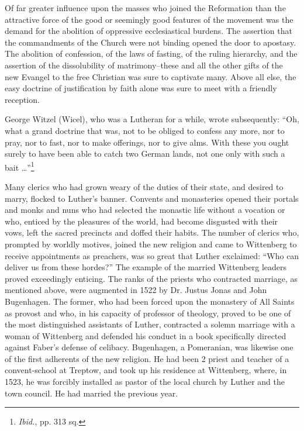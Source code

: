 Of far greater influence upon the masses who joined the Reformation
than the attractive force of the good or seemingly good
features of the movement was the demand for the abolition of oppressive
ecclesiastical burdens. The assertion that the commandments
of the Church were not binding opened the door to apostasy. The
abolition of confession, of the laws of fasting, of the ruling hierarchy,
and the assertion of the dissolubility of matrimony--these and all the
other gifts of the new Evangel to the free Christian was sure to captivate
many. Above all else, the easy doctrine of justification by faith
alone was sure  to meet with a friendly reception.

George Witzel (Wicel), who was a Lutheran for a while, wrote
subsequently: “Oh, what a grand doctrine that was, not to be obliged
to confess any more, nor to pray, nor to fast, nor to make offerings,
nor to give alms. With these you ought surely to have been able to
catch two German lands, not one only with such a bait \dots”\footnote
{\textit{Ibid.}, pp. 313 sq.}

Many clerics who had grown weary of the duties of their state, and
desired to marry, flocked to Luther’s banner. Convents and monasteries
opened their portals and monks and nuns who had selected the
monastic life without a vocation or who, enticed by the pleasures of
the world, had become disgusted with their vows, left the sacred
precincts and doffed their habits. The number of clerics who,
prompted by worldly motives, joined the new religion and came to
Wittenberg to receive appointments as preachers, was so great that
Luther exclaimed: “Who can deliver us from these hordes?” The example
of the married Wittenberg leaders proved exceedingly enticing.
The ranks of the priests who contracted marriage, as mentioned
above, were augmented in 1522 by Dr. Justus Jonas and John Bugenhagen.
The former, who had been forced upon the monastery of All
Saints as provost and who, in his capacity of professor of theology,
proved to be one of the most distinguished assistants of Luther, contracted
a solemn marriage with a woman of Wittenberg and defended his conduct in
a book specifically directed against Faber’s defense
of celibacy. Bugenhagen, a Pomeranian, was likewise one of
the first adherents of the new religion. He had been 2 priest and
teacher of a convent-school at Treptow, and took up his residence
at Wittenberg, where, in 1523, he was forcibly installed as pastor of
the local church by Luther and the town council. He had married
the previous year.

